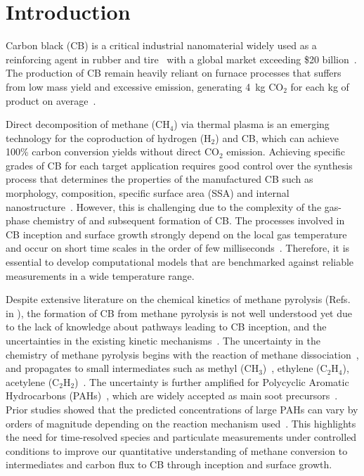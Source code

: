\section{Introduction}

Carbon black (CB) is a critical industrial nanomaterial widely used as a reinforcing agent in rubber and tire~\citep{robertson2021nature} with a global market exceeding \$20 billion~\citep{fortunebusiness2025}. The production of CB remain heavily reliant on furnace processes that suffers from low mass yield and excessive emission, generating  4~kg $\mathrm{CO_2}$ for each kg of product on average~\citep{bansal1993carbon}.

Direct decomposition of methane ($\mathrm{CH_4}$) via thermal plasma is an emerging technology for the coproduction of hydrogen ($\mathrm{H_2}$) and CB, which can achieve 100\% carbon conversion yields without direct $\mathrm{CO_2}$ emission. Achieving specific grades of CB for each target application requires good control over the synthesis process that determines the properties of the manufactured CB such as morphology, composition, specific surface area (SSA) and internal nanostructure~\citep{murphy2001additives}. However, this is challenging due to the complexity of the gas-phase chemistry of and subsequent formation of CB. The processes involved in CB inception and surface growth strongly depend on the local gas temperature~\cite{wang2011formation} and occur on short time scales in the order of few milliseconds~\citep{violi2005relative}. Therefore, it is essential to develop computational models that are benchmarked against reliable measurements in a wide temperature range.

Despite extensive literature on the chemical kinetics of methane pyrolysis (Refs. in \cite{fau2013methane}), the formation of CB from methane pyrolysis is not well understood yet due to the lack of knowledge about pathways leading to CB inception, and the uncertainties in the existing kinetic mechanisms~\citep{agafonov2016unified}. The uncertainty in the chemistry of methane pyrolysis begins with the reaction of methane dissociation~\citep{vlasov2022experimental}, and propagates to small intermediates such as methyl ($\mathrm{CH_3}$)~\citep{wang2016improved}, ethylene ($\mathrm{C_2H_4}$), acetylene ($\mathrm{C_2H_2}$)~\citep{sajid2016shock}. The uncertainty is further amplified for Polycyclic Aromatic Hydrocarbons (PAHs)~\citep{nativel2019shock}, which are widely accepted as main soot precursors~\cite{alfe2009structure}. Prior studies showed that the predicted concentrations of large PAHs can vary by orders of magnitude depending on the reaction mechanism used~\citep{wang2023systematic}. This highlights the need for time-resolved species and particulate measurements under controlled conditions to improve our quantitative understanding of methane conversion to intermediates and carbon flux to CB through inception and surface growth.

